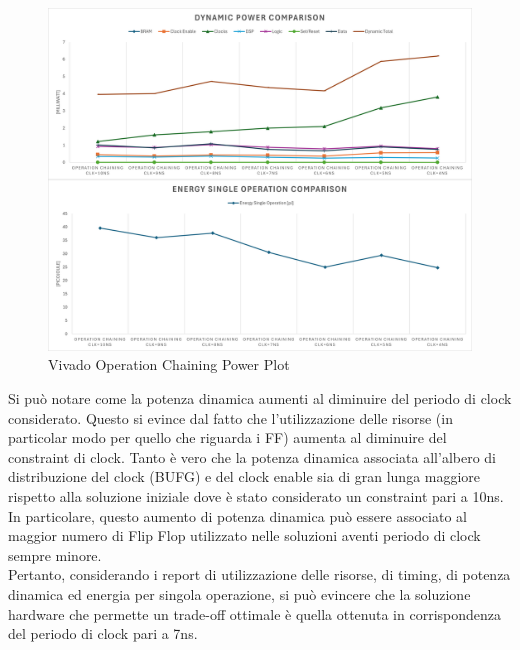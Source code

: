 \begin{figure}[H]
    \centering
    \includegraphics[width=\textwidth]{solutions/operation_chaining/operationchainingpower.png}
    \caption{Vivado Operation Chaining Power Plot}
    \label{fig:vivado-operation-chaining-power-plot}
\end{figure}

Si può notare come la potenza dinamica aumenti al diminuire del periodo di clock considerato. Questo si evince dal fatto che l'utilizzazione delle risorse (in particolar modo per quello che riguarda i FF) aumenta al diminuire del constraint di clock. Tanto è vero che la potenza dinamica associata all'albero di distribuzione del clock (BUFG) e del clock enable sia di gran lunga maggiore rispetto alla soluzione iniziale dove è stato considerato un constraint pari a 10ns. In particolare, questo aumento di potenza dinamica può essere associato al maggior numero di Flip Flop utilizzato nelle soluzioni aventi periodo di clock sempre minore.
\\
Pertanto, considerando i report di utilizzazione delle risorse, di timing, di potenza dinamica ed energia per singola operazione, si può evincere che la soluzione hardware che permette un trade-off ottimale è quella ottenuta in corrispondenza del periodo di clock pari a 7ns.